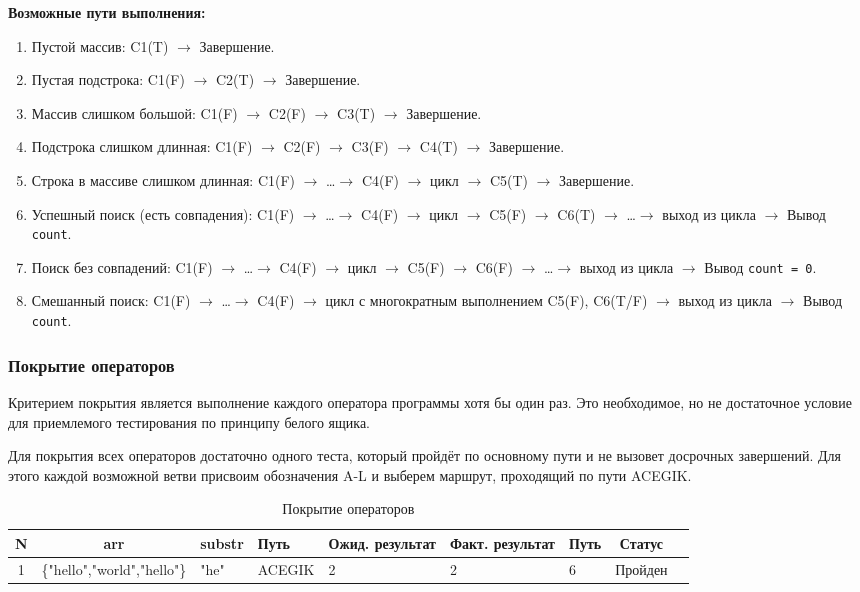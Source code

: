 \documentclass{article}[14pt]
\begin{document}
\noindent \textbf{Возможные пути выполнения:}

\begin{enumerate}
    \item Пустой массив: C1(T) $\to$ Завершение.
    \item Пустая подстрока: C1(F) $\to$ C2(T) $\to$ Завершение.
    \item Массив слишком большой: C1(F) $\to$ C2(F) $\to$ C3(T) $\to$ Завершение.
    \item Подстрока слишком длинная: C1(F) $\to$ C2(F) $\to$ C3(F) $\to$ C4(T) $\to$ Завершение.
    \item Строка в массиве слишком длинная: C1(F) $\to$ \ldots $\to$ C4(F) $\to$ цикл $\to$ C5(T) $\to$ Завершение.
    \item Успешный поиск (есть совпадения): C1(F) $\to$ \ldots $\to$ C4(F) $\to$ цикл $\to$ C5(F) $\to$ C6(T) $\to$ \ldots $\to$ выход из цикла $\to$ Вывод \texttt{count}.
    \item Поиск без совпадений: C1(F) $\to$ \ldots $\to$ C4(F) $\to$ цикл $\to$ C5(F) $\to$ C6(F) $\to$ \ldots $\to$ выход из цикла $\to$ Вывод \texttt{count = 0}.
    \item Смешанный поиск: C1(F) $\to$ \ldots $\to$ C4(F) $\to$ цикл с многократным выполнением C5(F), C6(T/F) $\to$ выход из цикла $\to$ Вывод \texttt{count}.
\end{enumerate}

\subsubsection{Покрытие операторов}

Критерием покрытия является выполнение каждого оператора программы хотя
бы один раз. Это необходимое, но не достаточное условие для приемлемого тестирования по принципу белого ящика.

Для покрытия всех операторов достаточно одного теста, который пройдёт по
основному пути и не вызовет досрочных завершений. Для этого каждой возможной ветви присвоим обозначения A-L и выберем маршрут,
проходящий по пути ACEGIK.

\begin{table}[h!]
\centering
\caption{Покрытие операторов}
\begin{tabularx}{\textwidth}{|c|c|X|X|X|X|X|c|c|}
\hline
\textbf{N} & \textbf{arr} & \textbf{substr} & Путь & \textbf{Ожид. результат} & \textbf{Факт. результат} & \textbf{Путь} & \textbf{Статус} \\
\hline
1 & \{"hello","world","hello"\} & "he" & ACEGIK & 2 & 2 & 6 & Пройден \\
\hline
\end{tabularx}
\end{table}
\end{document}
